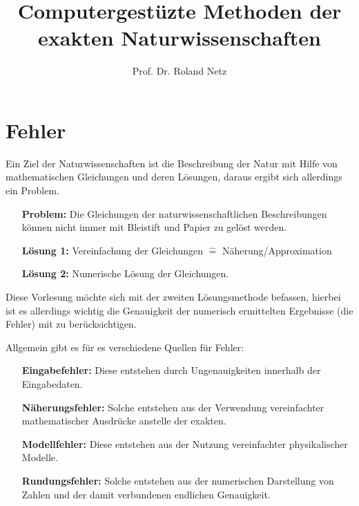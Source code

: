 \documentclass{scrartcl}
\begin{document}
\title{Computergestüzte Methoden der exakten Naturwissenschaften}
\author{Prof. Dr. Roland Netz}           
\maketitle
\tableofcontents
\newpage

\section{Fehler}
Ein Ziel der Naturwissenschaften ist die Beschreibung der Natur mit Hilfe von mathematischen Gleichungen und deren Lösungen, daraus ergibt sich allerdings ein Problem.
\begin{itemize}
\item[\textbf{Problem:}] Die Gleichungen der naturwissenschaftlichen  Beschreibungen können nicht immer mit Bleistift und Papier zu gelöst werden.
\item[\textbf{Lösung 1:}] Vereinfachung der Gleichungen $\hat{=}$ Näherung/Approximation
\item[\textbf{Lösung 2:}] Numerische Lösung der Gleichungen.
\end{itemize}
Diese Vorlesung möchte sich mit der zweiten Lösungsmethode befassen, hierbei ist es allerdings wichtig die Genauigkeit der numerisch ermittelten Ergebnisse (die Fehler) mit zu berücksichtigen.

  Allgemein gibt es für es verschiedene Quellen für Fehler:
\begin{itemize}
 \item[\textbf{Eingabefehler:}] Diese entstehen durch Ungenauigkeiten innerhalb der Eingabedaten.
  \item[\textbf{Näherungsfehler:}] Solche entstehen aus der Verwendung vereinfachter mathematischer Ausdrücke anstelle der exakten.
  \item[\textbf{Modellfehler:}] Diese entstehen aus der Nutzung vereinfachter physikalischer Modelle.
  \item[\textbf{Rundungsfehler:}] Solche entstehen aus der numerischen Darstellung von Zahlen und der damit verbundenen endlichen Genauigkeit.
\end{itemize}
\end{document}
